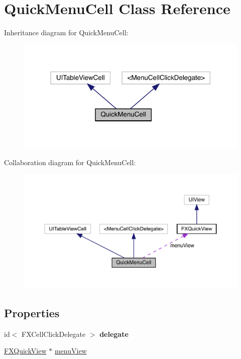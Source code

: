 \hypertarget{interface_quick_menu_cell}{}\section{Quick\+Menu\+Cell Class Reference}
\label{interface_quick_menu_cell}


Inheritance diagram for Quick\+Menu\+Cell\+:\nopagebreak
\begin{figure}[H]
\begin{center}
\leavevmode
\includegraphics[width=318pt]{interface_quick_menu_cell__inherit__graph}
\end{center}
\end{figure}


Collaboration diagram for Quick\+Menu\+Cell\+:\nopagebreak
\begin{figure}[H]
\begin{center}
\leavevmode
\includegraphics[width=350pt]{interface_quick_menu_cell__coll__graph}
\end{center}
\end{figure}
\subsection*{Properties}
\begin{DoxyCompactItemize}
\item 
\mbox{\label{interface_quick_menu_cell_ab8185b94b80295eb73880ee019c2caf4}} 
id$<$ F\+X\+Cell\+Click\+Delegate $>$ {\bfseries delegate}
\item 
\mbox{\hyperlink{interface_f_x_quick_view}{F\+X\+Quick\+View}} $\ast$ \mbox{\hyperlink{interface_quick_menu_cell_aed1333838656d44b390bbefe6299325c}{menu\+View}}
\end{DoxyCompactItemize}


